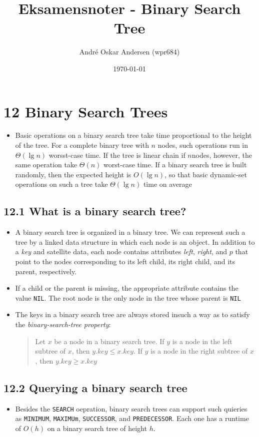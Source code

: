 \documentclass{report}
\title{Eksamensnoter - Binary Search Tree}
\author{André Oskar Andersen (wpr684)}
\date{\today}
\begin{document}
\maketitle

\section*{12 Binary Search Trees}
\begin{itemize}
    \item Basic operations on a binary search tree take time proportional to the height of the tree. For a complete binary tree with $n$ nodes, such operations run in $\Theta(\lg n)$ worsst-case time. If the tree is linear chain if $n$nodes, however, the same operation take $\Theta(n)$ worst-case time. If a binary search tree is built randomly, then the expected height is $O(\lg n)$, so that basic dynamic-set operations on such a tree take $\Theta(\lg n)$ time on average
\end{itemize}
\subsection*{12.1 What is a binary search tree?}
\begin{itemize}
    \item A binary search tree is organized in a binary tree. We can represent such a tree by a linked data structure in which each node is an object. In addition to a \textit{key} and satellite data, each node contains attributes \textit{left}, \textit{right}, and $p$ that point to the nodes corresponding to its left child, its right child, and its parent, respectively.
    \item If a child or the parent is missing, the appropriate attribute contains the value \texttt{NIL}. The root node is the only node in the tree whose parent is \texttt{NIL}
    \item The keys in a binary search tree are always stored insuch a way as to satisfy the \textit{binary-search-tree property}:
    \begin{quote}
        Let $x$ be a node in a binary search tree. If $y$ is a node in the left subtree of $x$, then $y.key \leq x.key$. If $y$ is a node in the right subtree of $x$, then $y.key \geq x.key$
    \end{quote}
\end{itemize}
\subsection*{12.2 Querying a binary search tree}
\begin{itemize}
    \item Besides the \texttt{SEARCH} oepration, binary search trees can support such quieries as \texttt{MINIMUM}, \texttt{MAXIMUm}, \texttt{SUCCESSOR}, and \texttt{PREDECESSOR}. Each one has a runtime of $O(h)$ on a binary search tree of height $h$.
\end{itemize}
\end{document}
